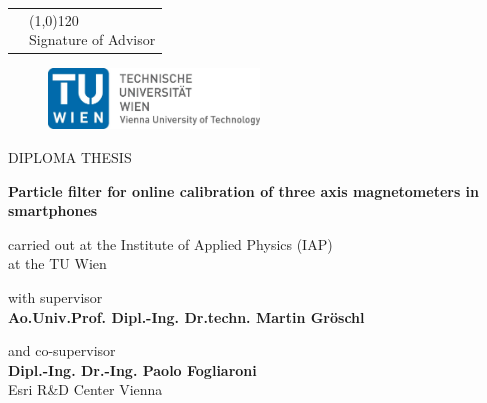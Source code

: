 \begin{titlepage}


\begin{tabular}{ >{\centering}p{9cm} >{\centering}p{7cm} }
	\space & {\line(1,0){120}\\Signature of Advisor}
\end{tabular}

\begin{center}

\begin{figure}[h]
	\centering
	\includegraphics[width=0.5\textwidth]{figures/TU_Wien_Logo.pdf}
\end{figure}

\begin{LARGE}

\par\noindent
DIPLOMA THESIS


\textbf{Particle filter for online calibration of three axis magnetometers in smartphones} \\

\end{LARGE}

\begin{large}
carried out at the Institute of Applied Physics (IAP) \\
at the TU Wien


with supervisor \\
\textbf{Ao.Univ.Prof. Dipl.-Ing. Dr.techn. Martin Gröschl}


and co-supervisor \\
\textbf{Dipl.-Ing. Dr.-Ing. Paolo Fogliaroni} \\
Esri R\&D Center Vienna


\end{large}
\end{center}
\end{titlepage}
